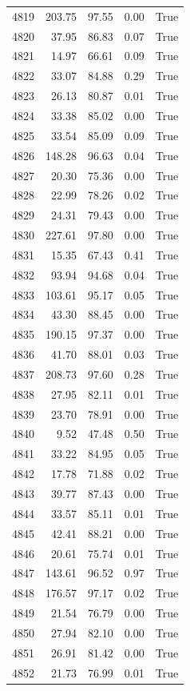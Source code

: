 \begin{longtable}{rrrrr}
4819 & 203.75 & 97.55 & 0.00 & True \\
4820 & 37.95 & 86.83 & 0.07 & True \\
4821 & 14.97 & 66.61 & 0.09 & True \\
4822 & 33.07 & 84.88 & 0.29 & True \\
4823 & 26.13 & 80.87 & 0.01 & True \\
4824 & 33.38 & 85.02 & 0.00 & True \\
4825 & 33.54 & 85.09 & 0.09 & True \\
4826 & 148.28 & 96.63 & 0.04 & True \\
4827 & 20.30 & 75.36 & 0.00 & True \\
4828 & 22.99 & 78.26 & 0.02 & True \\
4829 & 24.31 & 79.43 & 0.00 & True \\
4830 & 227.61 & 97.80 & 0.00 & True \\
4831 & 15.35 & 67.43 & 0.41 & True \\
4832 & 93.94 & 94.68 & 0.04 & True \\
4833 & 103.61 & 95.17 & 0.05 & True \\
4834 & 43.30 & 88.45 & 0.00 & True \\
4835 & 190.15 & 97.37 & 0.00 & True \\
4836 & 41.70 & 88.01 & 0.03 & True \\
4837 & 208.73 & 97.60 & 0.28 & True \\
4838 & 27.95 & 82.11 & 0.01 & True \\
4839 & 23.70 & 78.91 & 0.00 & True \\
4840 & 9.52 & 47.48 & 0.50 & True \\
4841 & 33.22 & 84.95 & 0.05 & True \\
4842 & 17.78 & 71.88 & 0.02 & True \\
4843 & 39.77 & 87.43 & 0.00 & True \\
4844 & 33.57 & 85.11 & 0.01 & True \\
4845 & 42.41 & 88.21 & 0.00 & True \\
4846 & 20.61 & 75.74 & 0.01 & True \\
4847 & 143.61 & 96.52 & 0.97 & True \\
4848 & 176.57 & 97.17 & 0.02 & True \\
4849 & 21.54 & 76.79 & 0.00 & True \\
4850 & 27.94 & 82.10 & 0.00 & True \\
4851 & 26.91 & 81.42 & 0.00 & True \\
4852 & 21.73 & 76.99 & 0.01 & True \\

\end{longtable}
